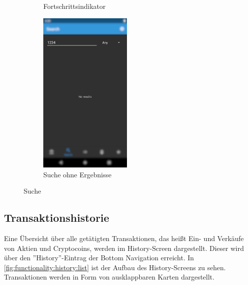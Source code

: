 \documentclass[a4paper]{article}
\begin{document}
\begin{figure}[H]
\begin{subfigure}{.5\textwidth}
		\caption{Fortschrittsindikator}
		\label{fig:functionality:search:loading}
	\end{subfigure}
	\begin{subfigure}{.5\textwidth}
		\centering
		\includegraphics[height=8cm,keepaspectratio]{./images/search/no_results.png}
		\caption{Suche ohne Ergebnisse}
		\label{fig:functionality:search:no-results}
	\end{subfigure}
	\caption{Suche}
	\label{fig:functionality:search}
\end{figure}


\subsection{Transaktionshistorie}
\label{subsec:functionality:history}
Eine Übersicht über alle getätigten Transaktionen, das heißt Ein- und Verkäufe von Aktien und Cryptocoins, werden im History-Screen dargestellt. Dieser wird über den ''History''-Eintrag der Bottom Navigation erreicht. In \autoref{fig:functionality:history:list} ist der Aufbau des History-Screens zu sehen. Transaktionen werden in Form von ausklappbaren Karten dargestellt.
\end{document}

